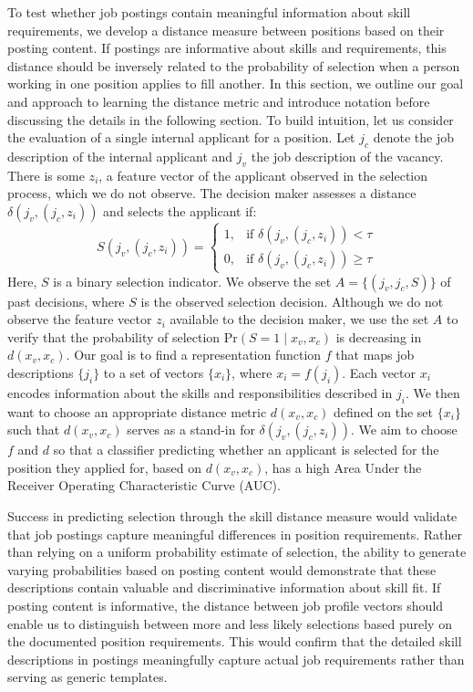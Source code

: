 \documentclass[12pt]{article}
\begin{document}
To test whether job postings contain meaningful information about skill requirements, we develop a distance measure between positions based on their posting content. If postings are informative about skills and requirements, this distance should be inversely related to the probability of selection when a person working in one position applies to fill another. In this section, we outline our goal and approach to learning the distance metric and introduce notation before discussing the details in the following section. To build intuition, let us consider the evaluation of a single internal applicant for a position. Let \(j_c\) denote the job description of the internal applicant and \(j_v\) the job description of the vacancy. There is some \(z_i\), a feature vector of the applicant observed in the selection process, which we do not observe. The decision maker assesses a distance \(\delta(j_v, (j_c, z_i))\) and selects the applicant if:
\[
S(j_v, (j_c, z_i)) = 
\begin{cases} 
1, & \text{if } \delta(j_v, (j_c, z_i)) < \tau \\
0, & \text{if } \delta(j_v, (j_c, z_i)) \geq \tau
\end{cases}
\]
Here, \(S\) is a binary selection indicator. We observe the set \(A = \{(j_v, j_c, S)\}\) of past decisions, where \(S\) is the observed selection decision. Although we do not observe the feature vector \(z_i\) available to the decision maker, we use the set \(A\) to verify that the probability of selection \(\text{Pr}(S = 1 \mid x_v, x_c)\) is decreasing in \(d(x_v, x_c)\). Our goal is to find a representation function \(f\) that maps job descriptions \(\{j_i\}\) to a set of vectors \(\{x_i\}\), where \(x_i = f(j_i)\). Each vector \(x_i\) encodes information about the skills and responsibilities described in \(j_i\). We then want to choose an appropriate distance metric \(d(x_v, x_c)\) defined on the set \(\{x_i\}\) such that \(d(x_v, x_c)\) serves as a stand-in for \(\delta(j_v, (j_c, z_i))\). We aim to choose \(f\) and \(d\) so that a classifier predicting whether an applicant is selected for the position they applied for, based on \(d(x_v, x_c)\), has a high Area Under the Receiver Operating Characteristic Curve (AUC).


Success in predicting selection through the skill distance measure would validate that job postings capture meaningful differences in position requirements. Rather than relying on a uniform probability estimate of selection, the ability to generate varying probabilities based on posting content would demonstrate that these descriptions contain valuable and discriminative information about skill fit. If posting content is informative, the distance between job profile vectors should enable us to distinguish between more and less likely selections based purely on the documented position requirements. This would confirm that the detailed skill descriptions in postings meaningfully capture actual job requirements rather than serving as generic templates.
\end{document}
